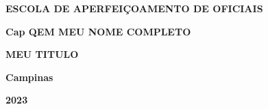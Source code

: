 \documentclass[12pt,a4paper]{article}
\def\mytitle{MEU TITULO}
\def\myname{Cap QEM MEU NOME COMPLETO}
\begin{document}

\begin{titlepage}
    \centering

    \onehalfspacing
    \textbf{\Large ESCOLA DE APERFEIÇOAMENTO DE OFICIAIS} %
    
    \vspace{2\baselineskip} %

    \textbf{\myname} %

    \vspace{7\baselineskip} %

    \textbf{\mytitle} %

    \vspace{2\baselineskip} %


    \vspace{\baselineskip} %


    \vfill %

    \vspace{5cm} %

    \textbf{Campinas} %

    \vspace{\baselineskip} %

    \textbf{2023} %
\end{titlepage}

\end{document}
